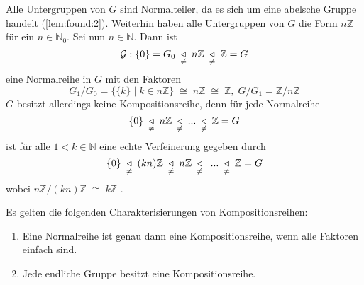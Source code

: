 \documentclass[../main.tex]{subfiles}
\begin{document}
\begin{example}[Kompositionsreihen von $(G := (\Z,+)$]
    Alle Untergruppen von $G$ sind Normalteiler, da es sich um eine abelsche Gruppe handelt (\cref{lem:found:2}). Weiterhin haben alle Untergruppen von $G$ die Form $n\mathbb{Z}$ für ein $n \in \mathbb{N}_0$.
    Sei nun $n \in \mathbb{N}$. Dann ist
    $$\mathcal{G}: \{0\} = G_0 \; \underset{\neq}{\triangleleft} \; n\mathbb{Z} \; \underset{\neq}{\triangleleft} \; \mathbb{Z} = G$$ eine Normalreihe in $G$ mit den Faktoren $$G_1/G_0 = \{\{k\} \mid k \in n\mathbb{Z}\} \; \cong \; n\mathbb{Z} \; \cong \; \mathbb{Z}, \; G/G_1 = \mathbb{Z}/n\mathbb{Z}$$
    $G$ besitzt allerdings keine Kompositionsreihe, denn für jede Normalreihe $$\{0\} \; \underset{\neq}{\triangleleft} \; n\mathbb{Z} \; \underset{\neq}{\triangleleft} \; ... \; \underset{\neq}{\triangleleft} \; \mathbb{Z} = G$$ ist für alle $1 < k \in \mathbb{N}$ eine echte Verfeinerung gegeben durch $$\{0\} \; \underset{\neq}{\triangleleft} \; (kn)\mathbb{Z} \; \underset{\neq}{\triangleleft} \; n\mathbb{Z} \; \underset{\neq}{\triangleleft} \; \; ... \; \underset{\neq}{\triangleleft} \; \mathbb{Z} = G$$
    wobei $n\mathbb{Z}/(kn)\mathbb{Z} \; \cong \; k\mathbb{Z}$ \TODO.
\end{example}
\begin{theorem} Es gelten die folgenden Charakterisierungen von Kompositionsreihen:
    \begin{enumerate}[label=(\alph*)]
        \item Eine Normalreihe ist genau dann eine Kompositionsreihe, wenn alle Faktoren einfach sind.
        \item Jede endliche Gruppe besitzt eine Kompositionsreihe.
    \end{enumerate}
\end{theorem}
\end{document}
